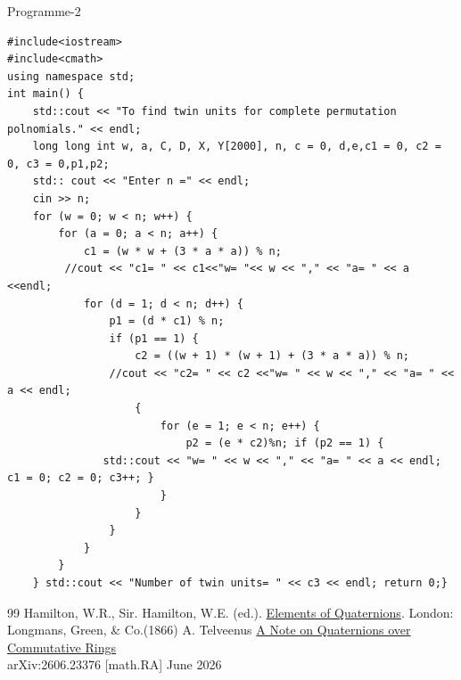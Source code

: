 \documentclass[sn-mathphys,Numbered]{sn-jnl}%
\theoremstyle{thmstyleone}
\theoremstyle{thmstyletwo}
\theoremstyle{thmstylethree}
\begin{document}
Programme-2 \\
\begin{verbatim}
#include<iostream>
#include<cmath>
using namespace std;
int main() {
	std::cout << "To find twin units for complete permutation polnomials." << endl;
	long long int w, a, C, D, X, Y[2000], n, c = 0, d,e,c1 = 0, c2 = 0, c3 = 0,p1,p2;
	std:: cout << "Enter n =" << endl;
	cin >> n;
	for (w = 0; w < n; w++) {
		for (a = 0; a < n; a++) {
			c1 = (w * w + (3 * a * a)) % n; 
         //cout << "c1= " << c1<<"w= "<< w << "," << "a= " << a <<endl;
			for (d = 1; d < n; d++) {
				p1 = (d * c1) % n;
				if (p1 == 1) {
					c2 = ((w + 1) * (w + 1) + (3 * a * a)) % n; 
                //cout << "c2= " << c2 <<"w= " << w << "," << "a= " << a << endl; 
					{
						for (e = 1; e < n; e++) {
							p2 = (e * c2)%n; if (p2 == 1) { 
               std::cout << "w= " << w << "," << "a= " << a << endl; c1 = 0; c2 = 0; c3++; }
						}
					}
				}
			}
		}
	} std::cout << "Number of twin units= " << c3 << endl; return 0;}
\end{verbatim}

\begin{thebibliography}{99}
Hamilton, W.R., Sir. Hamilton, W.E. (ed.).
\href{https://archive.org/details/elementsofquater00hamiuoft/page/44/mode/2up}{Elements of Quaternions}. London: Longmans, Green, \& Co.(1866)
A. Telveenus
\href{https://doi.org/10.48550/arXiv.2606.23376}{A Note on Quaternions over Commutative Rings} \\	arXiv:2606.23376 [math.RA] June 2026


\end{thebibliography}
\end{document}
